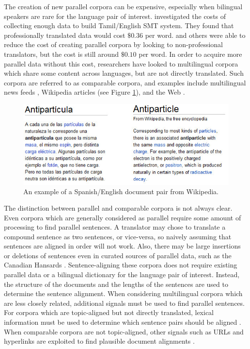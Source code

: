The creation of new parallel corpora can be expensive, especially when bilingual
speakers are rare for the language pair of interest. \citet{Germann01a}
investigated the costs of collecting enough data to build Tamil/English SMT
system. They found that professionally translated data would cost $\$0.36$ per
word. \citet{Germann01a} and others \citep{Zaidan11} were able to reduce the
cost of creating parallel corpora by looking to non-professional translators,
but the cost is still around $\$0.10$ per word.
In order to acquire more parallel data without this cost,
researchers have looked to multilingual corpora which share some content across languages,
but are not directly translated. Such corpora are referred to as comparable
corpora, and examples include multilingual news feeds \citep{Munteanu05},
Wikipedia articles \citep{Adafre06,Smith10} (see Figure \ref{fig:wiki}), and the Web
\citep{Resnik99,Nie99,Chen00}. 

\begin{figure}[ht]
\includegraphics[width=\textwidth]{images/wiki.jpg}
\caption{An example of a Spanish/English document pair from Wikipedia.}
\label{fig:wiki}
\end{figure}

The distinction between parallel and comparable corpora is not always clear.
Even corpora which are generally considered as parallel require some amount of
processing to find parallel sentences. 
A translator may chose to translate a compound sentence as two sentences, or
vice-versa, so naively assuming that sentences are aligned in order will not
work.
Also, there may be large insertions or deletions of sentences even in curated
sources of parallel data, such as the Canadian Hansards \citep{Gale93,Chen93}.
Sentence-aligning these corpora does not require existing parallel data or a
bilingual dictionary for the language pair of interest. Instead, the structure
of the documents and the lengths of the sentences are used to determine the
sentence alignment. When considering multilingual corpora which are less closely
related, additional signals must be used to
find parallel sentences. For corpora which are topic-aligned but not
directly translated, lexical information must be used to determine which
sentence pairs should be aligned \citep{Munteanu05}. When comparable corpora are
not topic-aligned, other signals such as URLs and hyperlinks are exploited to find plausible document
alignments \citep{Resnik03}.

